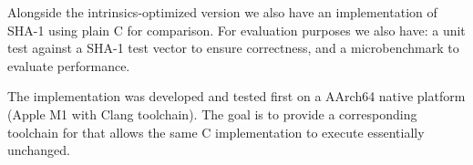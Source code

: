 %
Alongside the intrinsics-optimized version we also have an implementation of
SHA-1 using plain C for comparison.
%
For evaluation purposes we also have: a unit test against a SHA-1 test
vector to ensure correctness, and a microbenchmark to evaluate performance.

The implementation was developed and tested first on a AArch64 native platform
(Apple M1 with Clang toolchain). The goal is to provide a corresponding
toolchain for \wasm that allows the same C implementation to execute essentially
unchanged.

